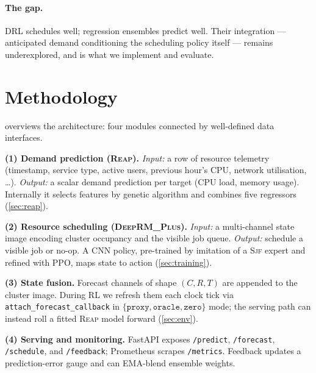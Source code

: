 \documentclass[runningheads]{llncs}
\newcommand{\reap}{\textsc{Reap}}
\newcommand{\deeprm}{\textsc{DeepRM\_Plus}}
\newcommand{\sjf}{\textsc{Sjf}}
\begin{document}
\paragraph{The gap.} DRL schedules well; regression ensembles predict
well. Their integration --- anticipated demand conditioning the
scheduling policy itself --- remains underexplored, and is what we
implement and evaluate.

\section{Methodology}\label{sec:methodology}
 overviews the architecture: four modules connected
by well-defined data interfaces.

\textbf{(1) Demand prediction (\reap{}).} \emph{Input:} a row of
resource telemetry (timestamp, service type, active users, previous
hour's CPU, network utilisation, \ldots). \emph{Output:} a scalar demand
prediction per target (CPU load, memory usage). Internally it selects
features by genetic algorithm and combines five regressors
(\cref{sec:reap}).

\textbf{(2) Resource scheduling (\deeprm{}).} \emph{Input:} a
multi-channel state image encoding cluster occupancy and the visible
job queue. \emph{Output:} schedule a visible job or no-op. A CNN
policy, pre-trained by imitation of a \sjf{} expert and refined with
PPO, maps state to action (\cref{sec:training}).

\textbf{(3) State fusion.} Forecast channels of shape $(C,R,T)$ are
appended to the cluster image. During RL we refresh them each clock
tick via \texttt{attach\_forecast\_callback} in
$\{\texttt{proxy},\texttt{oracle},\texttt{zero}\}$ mode; the serving
path can instead roll a fitted \reap{} model forward
(\cref{sec:env}).

\textbf{(4) Serving and monitoring.} FastAPI exposes
\texttt{/predict}, \texttt{/forecast}, \texttt{/schedule}, and
\texttt{/feedback}; Prometheus scrapes \texttt{/metrics}. Feedback
updates a prediction-error gauge and can EMA-blend ensemble weights.
\end{document}
